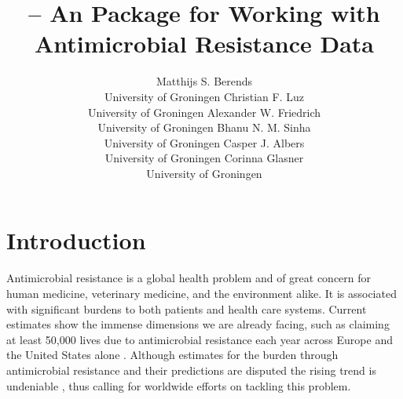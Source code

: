 \documentclass[article, shortnames]{jss}
\title{\pkg{AMR} -- An \proglang{R} Package for Working with Antimicrobial Resistance Data}
\author{Matthijs S. Berends\\
          University of Groningen
   \And Christian F. Luz\\
          University of Groningen
   \AND Alexander W. Friedrich\\
          University of Groningen
   \And Bhanu N. M. Sinha\\
          University of Groningen
   \AND Casper J. Albers\\
          University of Groningen
   \And Corinna Glasner\\
          University of Groningen
}
\begin{document}


\section[Introduction]{Introduction} \label{sec:intro}

Antimicrobial resistance is a global health problem and of great concern for
human medicine, veterinary medicine, and the environment alike.  It is
associated with significant burdens to both patients and health care
systems.  Current estimates show the immense dimensions we are already
facing, such as claiming at least 50,000 lives due to antimicrobial
resistance each year across Europe and the United States alone \citep{ONeill2014-fa}. 
Although estimates for the burden through antimicrobial resistance and their
predictions are disputed \citep{De_Kraker2016-aq} the rising trend is
undeniable \citep{CDC2019}, thus calling for worldwide efforts on tackling
this problem.
\end{document}
